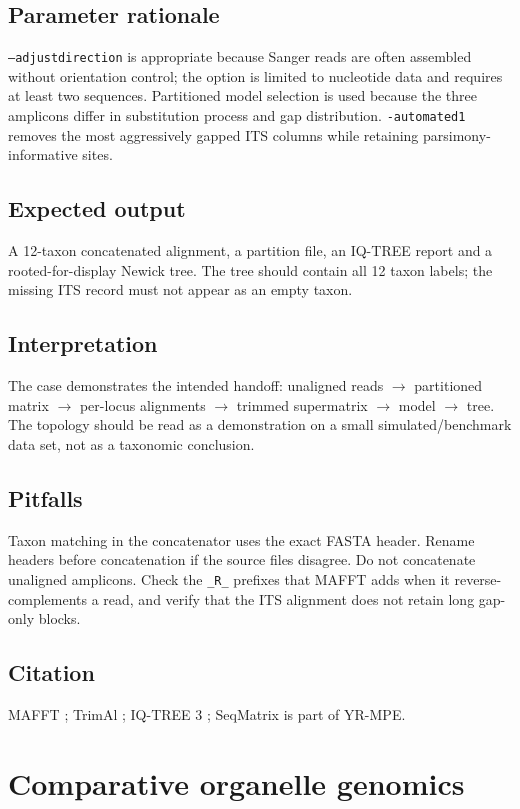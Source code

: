 \documentclass[11pt]{report}
\begin{document}
\section{Parameter rationale}
\texttt{--adjustdirection} is appropriate because Sanger reads are often
assembled without orientation control; the option is limited to nucleotide
data and requires at least two sequences. Partitioned model selection is used
because the three amplicons differ in substitution process and gap
distribution. \texttt{-automated1} removes the most aggressively gapped
ITS columns while retaining parsimony-informative sites.

\section{Expected output}
A 12-taxon concatenated alignment, a partition file, an IQ-TREE report and a
rooted-for-display Newick tree. The tree should contain all 12 taxon labels;
the missing ITS record must not appear as an empty taxon.

\section{Interpretation}
The case demonstrates the intended handoff: unaligned reads $\rightarrow$
partitioned matrix $\rightarrow$ per-locus alignments $\rightarrow$ trimmed
supermatrix $\rightarrow$ model $\rightarrow$ tree. The topology should be
read as a demonstration on a small simulated/benchmark data set, not as a
taxonomic conclusion.

\section{Pitfalls}
Taxon matching in the concatenator uses the exact FASTA header. Rename
headers before concatenation if the source files disagree. Do not
concatenate unaligned amplicons. Check the \texttt{\_R\_} prefixes that MAFFT
adds when it reverse-complements a read, and verify that the ITS alignment
does not retain long gap-only blocks.

\section{Citation}
MAFFT \cite{mafft}; TrimAl \cite{trimal};
IQ-TREE 3 \cite{iqtree3}; SeqMatrix is part of YR-MPE.

\chapter{Comparative organelle genomics}
\end{document}
